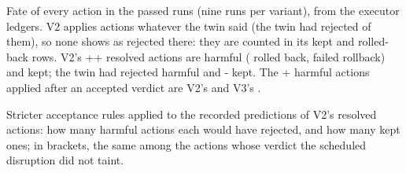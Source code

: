 \documentclass[conference]{IEEEtran}
\begin{document}
\begin{table}[t]
\caption{Fate of every action in the passed runs (nine runs per variant), from the executor ledgers. V2 applies actions whatever the twin said (the twin had rejected \SafeVtwoAppliedTwinRejected{} of them), so none shows as rejected there: they are counted in its kept and rolled-back rows. V2's \the\numexpr\LedVtwoKept+\LedVtwoRolledBack+\LedVtwoRollbackFailed\relax{} resolved actions are \HarmAll{} harmful (\LedVtwoRolledBack{} rolled back, \LedVtwoRollbackFailed{} failed rollback) and \KeptAll{} kept; the twin had rejected \VtwoRejHarm{} harmful and \the\numexpr\VtwoRejTotal-\VtwoRejHarm\relax{} kept. The \the\numexpr\HarmAccepted+\HarmVthree\relax{} harmful actions applied after an accepted verdict are V2's \HarmAccepted{} and V3's \HarmVthree{}.}
\label{tab:actions}
\centering

\end{table}

\begin{table}[t]
\caption{Stricter acceptance rules applied to the recorded predictions of V2's resolved actions: how many harmful actions each would have rejected, and how many kept ones; in brackets, the same among the actions whose verdict the scheduled disruption did not taint.}
\label{tab:rules}
\centering\small

\end{table}
\end{document}
